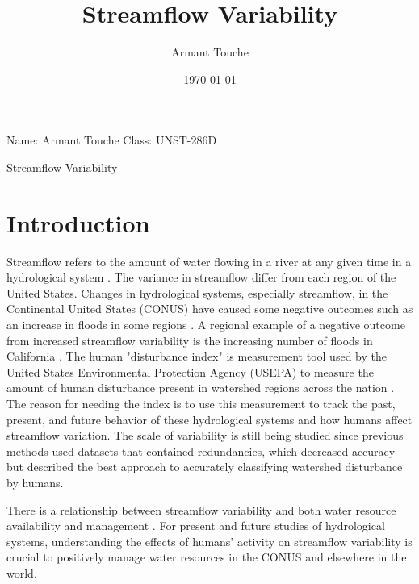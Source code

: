 \documentclass[a4paper,man,biblatex]{apa7}
\title{Streamflow Variability}
\author{Armant Touche}
\affiliation{Portland State University}
\date{\today}
\begin{document}
\noindent Name: Armant Touche\newline
\noindent Class: UNST-286D\newline
\begin{center}
    {\large Streamflow Variability}
\end{center}
\section{Introduction} 
\par  Streamflow refers to the amount of water flowing in a river at any given time in a hydrological system \autocite{streamflow_def}. The variance in streamflow differ from each region of the United States. Changes in hydrological systems, especially streamflow, in the Continental United States (CONUS) have caused some negative outcomes such as an increase in floods in some regions \autocite{rice_2016}. A regional example of a negative outcome from increased streamflow variability is the increasing number of floods in California \autocite{standford_2020}. The human "disturbance index" is measurement tool used by the United States Environmental Protection Agency (USEPA) to measure the amount of human disturbance present in watershed regions across the nation \autocite{falcone_2016}. The reason for needing the index is to use this measurement to track the past, present, and future behavior of these hydrological systems and how humans affect streamflow variation. The scale of variability is still being studied since previous methods used datasets that contained redundancies, which decreased accuracy but \textcite{falcone_2016} described the best approach to accurately classifying watershed disturbance by humans. 
\par There is a relationship between streamflow variability and both water resource availability and management \autocite{rice_2016}. For present and future studies of hydrological systems, understanding the effects of humans' activity on streamflow variability is crucial to positively manage water resources in the CONUS and elsewhere in the world.\\
\end{document}
